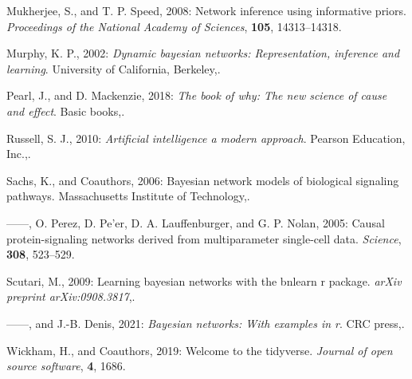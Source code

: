 \documentclass[twocol]{ametsoc}
\newlength{\cslhangindent}
\newlength{\cslentryspacingunit} %
\newenvironment{CSLReferences}[2] %
 {%
  \setlength{\parindent}{0pt}
  \ifodd #1
  \let\oldpar\par
  \def\par{\hangindent=\cslhangindent\oldpar}
  \fi
  \setlength{\parskip}{#2\cslentryspacingunit}
 }%
 {}
\begin{document}
\begin{CSLReferences}{1}{0}
\leavevmode{}%
Mukherjee, S., and T. P. Speed, 2008: Network inference using
informative priors. \emph{Proceedings of the National Academy of
Sciences}, \textbf{105}, 14313--14318.

\leavevmode{}%
Murphy, K. P., 2002: \emph{Dynamic bayesian networks: Representation,
inference and learning}. University of California, Berkeley,.

\leavevmode{}%
Pearl, J., and D. Mackenzie, 2018: \emph{The book of why: The new
science of cause and effect}. Basic books,.

\leavevmode{}%
Russell, S. J., 2010: \emph{Artificial intelligence a modern approach}.
Pearson Education, Inc.,.

\leavevmode{}%
Sachs, K., and Coauthors, 2006: Bayesian network models of biological
signaling pathways. Massachusetts Institute of Technology,.

\leavevmode{}%
------, O. Perez, D. Pe'er, D. A. Lauffenburger, and G. P. Nolan, 2005:
Causal protein-signaling networks derived from multiparameter
single-cell data. \emph{Science}, \textbf{308}, 523--529.

\leavevmode{}%
Scutari, M., 2009: Learning bayesian networks with the bnlearn r
package. \emph{arXiv preprint arXiv:0908.3817},.

\leavevmode{}%
------, and J.-B. Denis, 2021: \emph{Bayesian networks: With examples in
r}. CRC press,.

\leavevmode{}%
Wickham, H., and Coauthors, 2019: Welcome to the tidyverse.
\emph{Journal of open source software}, \textbf{4}, 1686.

\end{CSLReferences}
\end{document}
